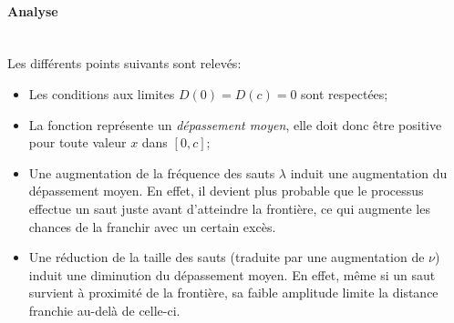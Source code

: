 \FloatBarrier\paragraph{Analyse}\phantom{}\\
Les différents points suivants sont relevés:
\begin{itemize}
    \item Les conditions aux limites $D(0)=D(c)=0$ sont respectées;
    \item La fonction représente un \textit{dépassement moyen}, elle doit donc être positive pour toute valeur $x$ dans $[0,c]$;
    \item Une augmentation de la fréquence des sauts $\lambda$ induit une augmentation du dépassement moyen. En effet, il devient plus probable que le processus effectue un saut juste avant d'atteindre la frontière, ce qui augmente les chances de la franchir avec un certain excès.
    \item Une réduction de la taille des sauts (traduite par une augmentation de $\nu$) induit une diminution du dépassement moyen. En effet, même si un saut survient à proximité de la frontière, sa faible amplitude limite la distance franchie au-delà de celle-ci.
\end{itemize}

